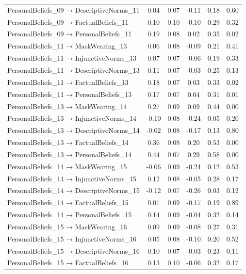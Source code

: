 \documentclass[
  man, donotrepeattitle,floatsintext]{apa6}
\begin{document}
\begin{center}
\begin{ThreePartTable}
{\begin{longtable}{lccccc}
PersonalBeliefs\_09 → DescriptiveNorms\_11 & 0.04 & 0.07 & -0.11 & 0.18 & 0.60\\
PersonalBeliefs\_09 → FactualBeliefs\_11 & 0.10 & 0.10 & -0.10 & 0.29 & 0.32\\
PersonalBeliefs\_09 → PersonalBeliefs\_11 & 0.19 & 0.08 & 0.02 & 0.35 & 0.02\\
PersonalBeliefs\_11 → MaskWearing\_13 & 0.06 & 0.08 & -0.09 & 0.21 & 0.41\\
PersonalBeliefs\_11 → InjunctiveNorms\_13 & 0.07 & 0.07 & -0.06 & 0.19 & 0.33\\
PersonalBeliefs\_11 → DescriptiveNorms\_13 & 0.11 & 0.07 & -0.03 & 0.25 & 0.13\\
PersonalBeliefs\_11 → FactualBeliefs\_13 & 0.18 & 0.07 & 0.03 & 0.33 & 0.02\\
PersonalBeliefs\_11 → PersonalBeliefs\_13 & 0.17 & 0.07 & 0.04 & 0.31 & 0.01\\
PersonalBeliefs\_13 → MaskWearing\_14 & 0.27 & 0.09 & 0.09 & 0.44 & 0.00\\
PersonalBeliefs\_13 → InjunctiveNorms\_14 & -0.10 & 0.08 & -0.24 & 0.05 & 0.20\\
PersonalBeliefs\_13 → DescriptiveNorms\_14 & -0.02 & 0.08 & -0.17 & 0.13 & 0.80\\
PersonalBeliefs\_13 → FactualBeliefs\_14 & 0.36 & 0.08 & 0.20 & 0.53 & 0.00\\
PersonalBeliefs\_13 → PersonalBeliefs\_14 & 0.44 & 0.07 & 0.29 & 0.58 & 0.00\\
PersonalBeliefs\_14 → MaskWearing\_15 & -0.06 & 0.09 & -0.24 & 0.12 & 0.53\\
PersonalBeliefs\_14 → InjunctiveNorms\_15 & 0.12 & 0.08 & -0.05 & 0.28 & 0.17\\
PersonalBeliefs\_14 → DescriptiveNorms\_15 & -0.12 & 0.07 & -0.26 & 0.03 & 0.12\\
PersonalBeliefs\_14 → FactualBeliefs\_15 & 0.01 & 0.09 & -0.17 & 0.19 & 0.89\\
PersonalBeliefs\_14 → PersonalBeliefs\_15 & 0.14 & 0.09 & -0.04 & 0.32 & 0.14\\
PersonalBeliefs\_15 → MaskWearing\_16 & 0.09 & 0.09 & -0.08 & 0.27 & 0.31\\
PersonalBeliefs\_15 → InjunctiveNorms\_16 & 0.05 & 0.08 & -0.10 & 0.20 & 0.52\\
PersonalBeliefs\_15 → DescriptiveNorms\_16 & 0.10 & 0.07 & -0.03 & 0.23 & 0.11\\
PersonalBeliefs\_15 → FactualBeliefs\_16 & 0.13 & 0.10 & -0.06 & 0.32 & 0.17\\

\end{longtable}}
\end{ThreePartTable}
\end{center}
\end{document}

